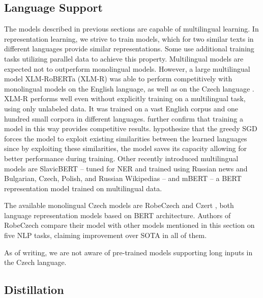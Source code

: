 \subsection{Language Support}

The models described in previous sections are capable of multilingual learning.
In representation learning, we strive to train models, which for two similar texts in different languages provide similar representations.
Some \citep{cross-lingual} use additional training tasks utilizing parallel data to achieve this property.
Multilingual models are expected not to outperform monolingual models.
However, a large multilingual model XLM-RoBERTa (XLM-R) \citep{xlmr} was able to perform competitively with monolingual models on the English language, as well as on the Czech language \citep{mackova}.
XLM-R performs well even without explicitly training on a multilingual task, using only unlabeled data.
It was trained on a vast English corpus and one hundred small corpora in different languages. 
\citet{cross-lingual} further confirm that training a model in this way provides competitive results.
\citet{mackova} hypothesize that the greedy SGD forces the model to exploit existing similarities between the learned languages since by exploiting these similarities, the model saves its capacity allowing for better performance during training.
Other recently introduced multilingual models are SlavicBERT \citep{deep-pavlov} -- tuned for NER and trained using Russian news and Bulgarian, Czech, Polish, and Russian Wikipedias -- and mBERT -- a BERT representation model trained on multilingual data.

The available monolingual Czech models are RobeCzech \citep{robeczech} and Czert \citep{czert}, both language representation models based on BERT architecture.
Authors of RobeCzech compare their model with other models mentioned in this section on five NLP tasks, claiming improvement over SOTA in all of them.

As of writing, we are not aware of pre-trained models supporting long inputs in the Czech language.

\subsection{Distillation}



